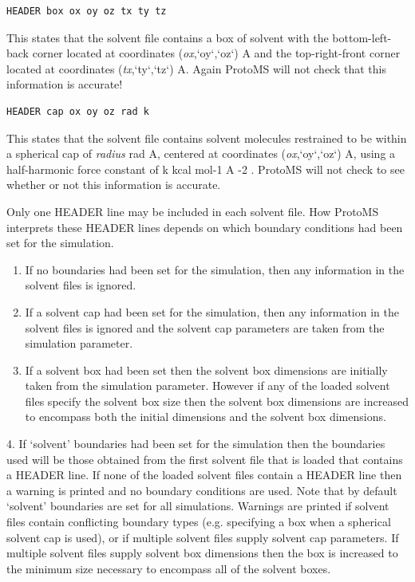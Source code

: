 \documentclass[letterpaper,10pt,english]{sphinxmanual}
\begin{document}
\begin{Verbatim}[commandchars=\\\{\}]
HEADER box ox oy oz tx ty tz
\end{Verbatim}

This states that the solvent file contains a box of solvent with the bottom-left-back corner located at coordinates (\emph{ox},{}`oy{}`,{}`oz{}`) A and the top-right-front corner located at coordinates (\emph{tx},{}`ty{}`,{}`tz{}`) A. Again ProtoMS will not check that this information is accurate!

\begin{Verbatim}[commandchars=\\\{\}]
HEADER cap ox oy oz rad k
\end{Verbatim}

This states that the solvent file contains solvent molecules restrained to be within a spherical cap of \emph{radius} rad A, centered at coordinates (\emph{ox},{}`oy{}`,{}`oz{}`) A, using a half-harmonic force constant of k kcal mol-1 A -2 . ProtoMS will not check to see whether or not this information is accurate.

Only one HEADER line may be included in each solvent file. How ProtoMS interprets these HEADER lines depends on which boundary conditions had been set for the simulation.
\begin{enumerate}
\item {} 
If no boundaries had been set for the simulation, then any information in the solvent files is ignored.

\item {} 
If a solvent cap had been set for the simulation, then any information in the solvent files is ignored and the solvent cap parameters are taken from the simulation parameter.

\item {} 
If a solvent box had been set then the solvent box dimensions are initially taken from the simulation parameter. However if any of the loaded solvent files specify the solvent box size then the solvent box dimensions are increased to encompass both the initial dimensions and the solvent box dimensions.

\end{enumerate}

4. If ‘solvent’ boundaries had been set for the simulation then the boundaries used will be those obtained from the first solvent file that is loaded that contains a HEADER line. If none of the loaded solvent files contain a HEADER line then a warning is printed and no boundary conditions are used. Note that by default ‘solvent’ boundaries are set for all simulations.
Warnings are printed if solvent files contain conflicting boundary types (e.g. specifying a box when a spherical solvent cap is used), or if multiple solvent files supply solvent cap parameters. If multiple solvent files supply solvent box dimensions then the box is increased to the minimum size necessary to encompass all of the solvent boxes.
\end{document}
